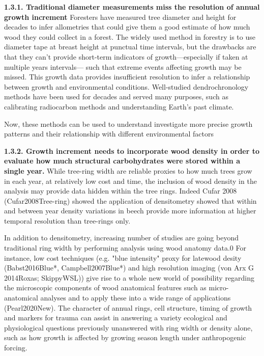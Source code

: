 \documentclass{article}
\begin{document}
\textbf{1.3.1. Traditional diameter measurements miss the resolution of annual growth increment}
Foresters have measured tree diameter and height for decades to infer allometries that could give them a good estimate of how much wood they could collect in a forest. The widely used method in forestry is to use diameter tape at breast height at punctual time intervals, but the drawbacks are that they can't provide short-term indicators of growth---especially if taken at multiple years intervals--- such that extreme events affecting growth may be missed. This growth data provides insufficient resolution to infer a relationship between growth and environmental conditions. Well-studied dendrochronology methods have been used for decades and served many purposes, such as calibrating radiocarbon methods and understanding Earth's past climate. 

Now, these methods can be used to understand investigate more precise growth patterns and their relationship with different environmental factors

\textbf{1.3.2. Growth increment needs to incorporate wood density in order to evaluate how much structural carbohydrates were stored within a single year.}
While tree-ring width are reliable proxies to how much trees grow in each year, at relatively low cost and time, the inclusion of wood density in the analysis may provide data hidden within the tree rings. Indeed Cufar 2008 (Cufar2008Tree-ring) showed the application of densitometry showed that within and between year density variations in beech provide more information at higher temporal resolution than tree-rings only. 

In addition to densitometry, increasing number of studies are going beyond traditional ring width by performing analysis using wood anatomy data.0 For instance, low cost techniques (e.g. "blue intensity" proxy for latewood desity (Babst2016Blue*, Campbell2007Blue*) and high resolution imaging (von Arx G 2014Roxas; SkippyWSL)) give rise to a whole new world of possibility regarding the microscopic components of wood anatomical features such as micro-anatomical analyses and to apply these into a wide range of applications (Pearl2020New). The character of annual rings, cell structure, timing of growth and markers for trauma can assist in answering a variety ecological and physiological questions previously unanswered with ring width or density alone, such as how growth is affected by growing season length under anthropogenic forcing.
\end{document}
